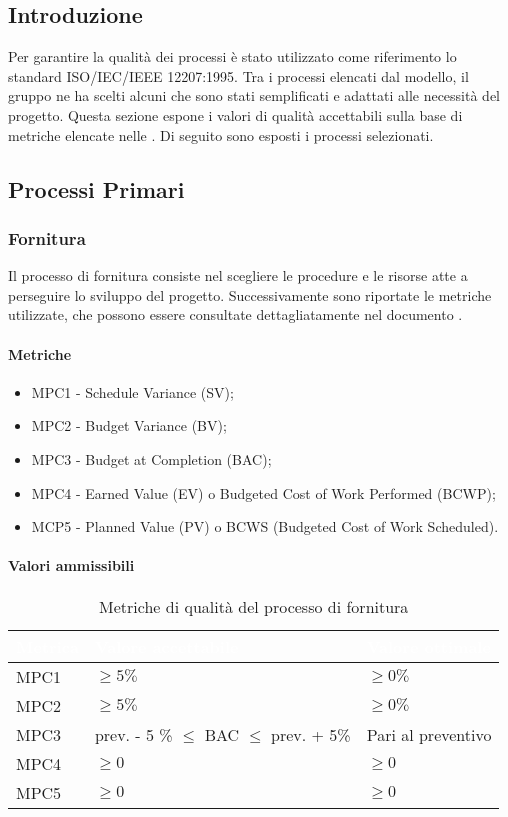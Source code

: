 
\subsection{Introduzione}
Per garantire la qualità dei processi è stato utilizzato come riferimento lo standard ISO/IEC/IEEE 12207:1995. Tra i processi elencati dal modello, il gruppo ne ha scelti alcuni che sono stati semplificati e adattati alle necessità del progetto. Questa sezione espone i valori di qualità accettabili sulla base di metriche elencate nelle . Di seguito sono esposti i processi selezionati.

\subsection{Processi Primari}

\subsubsection{Fornitura}
Il processo di fornitura consiste nel scegliere le procedure e le risorse atte a perseguire lo sviluppo del progetto. Successivamente sono riportate le metriche utilizzate, che possono essere consultate dettagliatamente nel documento .

\paragraph{Metriche}
\begin{itemize}
	\item MPC1 - Schedule Variance (SV);
	\item MPC2 - Budget Variance (BV);
	\item MPC3 - Budget at Completion (BAC);
	\item MPC4 - Earned Value (EV) o Budgeted Cost of Work Performed (BCWP);
	\item MCP5 - Planned Value (PV) o BCWS (Budgeted Cost of Work Scheduled).
\end{itemize}

\paragraph{Valori ammissibili}
{
\renewcommand{\arraystretch}{1.5}
\centering
\begin{longtable}{C{2.5cm} C{7cm} C{4cm}}
\textcolor{white}{\textbf{Metrica}}&
\textcolor{white}{\textbf{Valore accettabile}}&
\textcolor{white}{\textbf{Valore ottimale}}\\	
\endhead
\endfoot
{}\caption{Metriche di qualità del processo di fornitura}
\endlastfoot

MPC1 & $\geq 5\%$ & $\geq 0\%$ \\
MPC2 & $\geq 5\%$ & $\geq 0\%$ \\
MPC3 & prev. - 5 \% $ \leq $ BAC $ \leq $ prev. + 5\% & Pari al preventivo  \\
MPC4 & $\geq 0$  & $\geq 0$ \\
MPC5 & $\geq 0$  & $\geq 0$ \\
\end{longtable}
}



